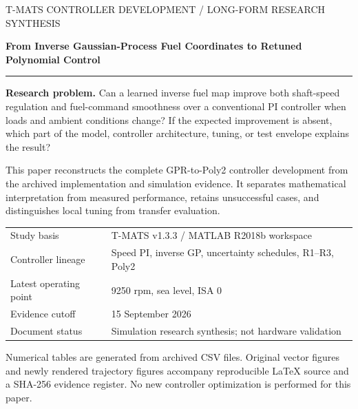 \documentclass[11pt,a4paper,oneside]{report}
\begin{document}
\begin{titlepage}
\color{navy}\sffamily
{\small T-MATS CONTROLLER DEVELOPMENT / LONG-FORM RESEARCH SYNTHESIS}\par\vspace{17mm}
{\fontsize{29}{35}\selectfont\bfseries From Inverse Gaussian-Process Fuel Coordinates to Retuned Polynomial Control\par}
\vspace{10mm}{\Large Algorithms, evidence, limitations, and lessons from a sequential gas-turbine simulation study\par}
\vspace{9mm}\textcolor{teal}{\rule{\linewidth}{1.2pt}}\vspace{9mm}
\normalfont\color{black}
\textbf{Research problem.} Can a learned inverse fuel map improve both shaft-speed regulation and fuel-command smoothness over a conventional PI controller when loads and ambient conditions change? If the expected improvement is absent, which part of the model, controller architecture, tuning, or test envelope explains the result?

This paper reconstructs the complete GPR-to-Poly2 controller development from the archived implementation and simulation evidence. It separates mathematical interpretation from measured performance, retains unsuccessful cases, and distinguishes local tuning from transfer evaluation.

\vspace{8mm}
\begin{tabular}{@{}ll@{}}
Study basis & T-MATS v1.3.3 / MATLAB R2018b workspace\\[4pt]
Controller lineage & Speed PI, inverse GP, uncertainty schedules, R1--R3, Poly2\\[4pt]
Latest operating point & 9250 rpm, sea level, ISA 0\\[4pt]
Evidence cutoff & 15 September 2026\\[4pt]
Document status & Simulation research synthesis; not hardware validation
\end{tabular}
\vfill
\small Numerical tables are generated from archived CSV files. Original vector figures and newly rendered trajectory figures accompany reproducible LaTeX source and a SHA-256 evidence register. No new controller optimization is performed for this paper.
\end{titlepage}
\end{document}

